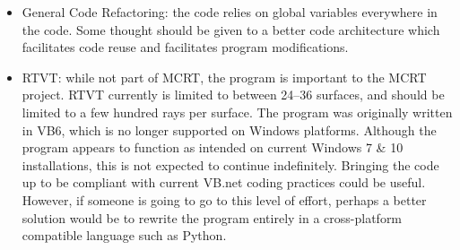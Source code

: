 \documentclass{article}
\begin{document}
\begin{itemize}
    \item General Code Refactoring: the code relies on global variables everywhere in the code. Some thought should be given to a better code architecture which facilitates code reuse and facilitates program modifications.

    \item RTVT: while not part of MCRT, the program is important to the MCRT project. RTVT currently is limited to between 24--36 surfaces, and should be limited to a few hundred rays per surface. The program was originally written in VB6, which is no longer supported on Windows platforms. Although the program appears to function as intended on current Windows 7 \& 10 installations, this is not expected to continue indefinitely. Bringing the code up to be compliant with current VB.net coding practices could be useful. However, if someone is going to go to this level of effort, perhaps a better solution would be to rewrite the program entirely in a cross-platform compatible language such as Python.

\end{itemize}

\newpage
\renewcommand\bibname{References}

\end{document}
